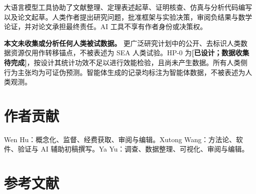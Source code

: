 \documentclass[
  chinese,
  11pt]{article}
\begin{document}
大语言模型工具协助了文献整理、定理表述起草、证明核查、仿真与分析代码编写以及论文起草。人类作者提出研究问题，批准框架与实验决策，审阅负结果与数学论证，并对论文承担最终责任。AI 工具不享有作者身份或决策权。

\textbf{本文未收集或分析任何人类被试数据。} 更广泛研究计划中的公开、去标识人类数据资源仅用作转移锚点，不被表述为 SEA 人类试验。HP-0 为\textbf{{[}已设计；数据收集待完成{]}}，按设计其统计功效不足以进行效能检验，且尚未产生数据。所有人类侧行为主张均为可证伪预测。智能体生成的记录均标注为智能体数据，不被表述为人类观测。

\section{作者贡献}\label{ux4f5cux8005ux8d21ux732e}

Wen Hu：概念化、监督、经费获取、审阅与编辑。Xutong Wang：方法论、软件、验证与 AI 辅助初稿撰写。Ya Yu：调查、数据整理、可视化、审阅与编辑。

\section{参考文献}\label{ux53c2ux8003ux6587ux732e}
\end{document}
